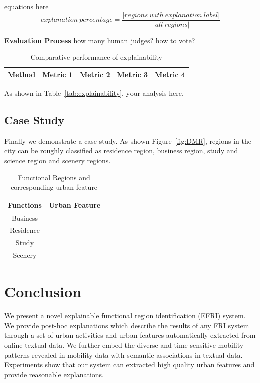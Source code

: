 \documentclass[runningheads]{llncs}
\begin{document}
equations here 
$$explanation\ percentage=\frac{|regions\ with\ explanation\ label|}{|all\ regions|}$$

\textbf{Evaluation Process}  how many human judges? how to vote?


\begin{table}[h]
\caption{Comparative performance of explainability }\label{tab:explainablity}
\begin{tabular}{|c|c|c|c|c|}
\hline
Method & Metric 1 & Metric 2 & Metric 3 & Metric 4\\\hline
\end{tabular}
\end{table}

As shown in Table~\ref{tab:explainability}, your analysis here.




\subsection{Case Study}
Finally we demonstrate a case study. As shown Figure~\ref{fig:DMR}, regions in the city can be roughly classified as residence region, business region, study and science region and scenery regions.
\begin{table}[h]
\centering
\caption{Functional Regions and corresponding urban feature}\label{dataset}
\begin{tabular}{c|c}
\hline
Functions & Urban Feature\\
\hline
Business & \\
\hline
Residence & \\
\hline
Study & \\
\hline
Scenery & \\
\hline
\end{tabular}
\end{table}






\section{Conclusion}\label{sec:conclusions}
We present a novel explainable functional region identification (EFRI) system.
We provide post-hoc explanations which describe the results of any FRI system through a set of urban activities and urban features automatically extracted from online textual data.
We further embed the diverse and time-sensitive mobility patterns revealed in mobility data with semantic associations in textual data.
Experiments show that our system can extracted high quality urban features and provide reasonable explanations.
\end{document}
